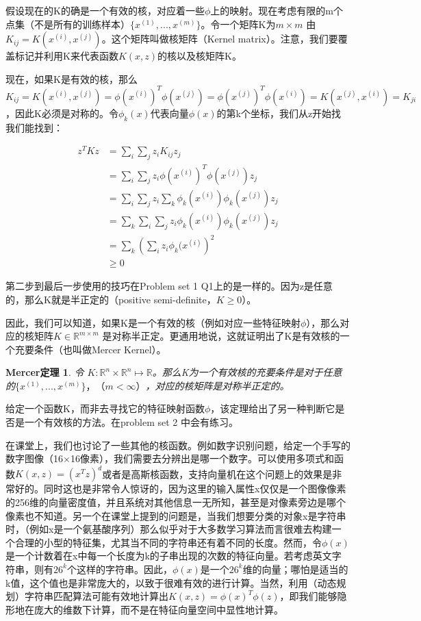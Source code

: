 \documentclass[UTF8]{ctexart}
\begin{document}
假设现在的K的确是一个有效的核，对应着一些$\phi$上的映射。现在考虑有限的m个点集（不是所有的训练样本）$\{x^{(1)},..., x^{(m)}\}$。令一个矩阵K为$m \times m$ 由$K_{ij}= K(x^{(i)},x^{(j)})$。这个矩阵叫做核矩阵（Kernel matrix）。注意，我们要覆盖标记并利用K来代表函数$ K(x,z) $的核以及核矩阵K。

现在，如果K是有效的核，那么$K_{ij}= K(x^{(i)},x^{(j)}) = \phi(x^{(i)})^{T}\phi(x^{(j)}) = \phi(x^{(j)})^{T}\phi(x^{(i)}) = K(x^{(j)},x^{(i)}) = K_{ji}$，因此K必须是对称的。令$\phi_{k}(x)$代表向量$\phi(x)$的第k个坐标，我们从z开始找我们能找到：

\begin{align*}
z^{T}Kz & = \sum_{i} \sum_{j} z_{i}K_{ij}z_{j} \\
& = \sum_{i} \sum_{j} z_{i}\phi(x^{(i)})^{T}\phi(x^{(j)})z_{j}\\
& = \sum_{i} \sum_{j} z_{i}  \sum_{k}   \phi_{k}(x^{(i)})\phi_{k}(x^{(j)})z_{j}\\
& =  \sum_{k} \sum_{i} \sum_{j}  z_{i} \phi_{k}(x^{(i)})\phi_{k}(x^{(j)})z_{j} \\
& =  \sum_{k}  \left(\sum_{i}   z_{i}  \phi_{k}(x^{(i)} \right)^{2}\\
& \geq 0
\end{align*}


第二步到最后一步使用的技巧在Problem set 1 Q1上的是一样的。因为z是任意的，那么K就是半正定的（positive semi-definite，$K\geq 0$）。

因此，我们可以知道，如果K是一个有效的核（例如对应一些特征映射$\phi$），那么对应的核矩阵$K \in \mathbb{R}^{m\times m}$ 是对称半正定。更通用地说，这就证明出了K是有效核的一个充要条件（也叫做Mercer Kernel）。


\newtheorem{law}{Mercer定理}[section]
\begin{law} \label{law:box}
  令 $K:\mathbb{R}^{n} \times \mathbb{R}^{n} \mapsto \mathbb{R}$。那么K为一个有效核的充要条件是对于任意的$\{x^{(1)},..., x^{(m)}\}，（m<\infty）$，对应的核矩阵是对称半正定的。
\end{law}


给定一个函数K，而非去寻找它的特征映射函数$\phi$，该定理给出了另一种判断它是否是一个有效核的方法。在problem set 2 中会有练习。

在课堂上，我们也讨论了一些其他的核函数。例如数字识别问题，给定一个手写的数字图像（16$\times$16像素），我们需要去分辨出是哪一个数字。可以使用多项式和函数$K(x,z) = (x^{T}z)^{d}$或者是高斯核函数，支持向量机在这个问题上的效果是非常好的。同时这也是非常令人惊讶的，因为这里的输入属性x仅仅是一个图像像素的256维的向量密度值，并且系统对其他信息一无所知，甚至是对像素旁边是哪个像素也不知道。另一个在课堂上提到的问题是，当我们想要分类的对象x是字符串时，（例如x是一个氨基酸序列）那么似乎对于大多数学习算法而言很难去构建一个合理的小型的特征集，尤其当不同的字符串还有着不同的长度。然而，令$\phi(x)$是一个计数着在x中每一个长度为k的子串出现的次数的特征向量。若考虑英文字符串，则有$26^{k}$个这样的字符串。因此，$\phi(x)$是一个$26^{k}$维的向量；哪怕是适当的k值，这个值也是非常庞大的，以致于很难有效的进行计算。当然，利用（动态规划）字符串匹配算法可能有效地计算出$K(x,z)=\phi(x)^{T}\phi(z)$，即我们能够隐形地在庞大的维数下计算，而不是在特征向量空间中显性地计算。
\end{document}

